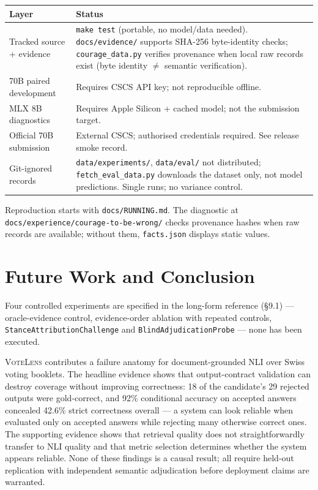 \documentclass[10pt,a4paper]{article}
\newcommand{\votelens}{\textsc{VoteLens}}
\begin{document}
\begin{center}\small
\begin{tabular}{@{}p{3.6cm}p{13.1cm}@{}}
\toprule
Layer & Status \\
\midrule
Tracked source + evidence & \texttt{make test} (portable, no model/data needed). \texttt{docs/evidence/} supports SHA-256 byte-identity checks; \texttt{courage\_data.py} verifies provenance when local raw records exist (byte identity $\neq$ semantic verification). \\
70B paired development & Requires CSCS API key; not reproducible offline. \\
MLX 8B diagnostics & Requires Apple Silicon + cached model; not the submission target. \\
Official 70B submission & External CSCS; authorised credentials required. See release smoke record. \\
Git-ignored records & \texttt{data/experiments/}, \texttt{data/eval/} not distributed; \texttt{fetch\_eval\_data.py} downloads the dataset only, not model predictions. Single runs; no variance control. \\
\bottomrule
\end{tabular}
\end{center}

Reproduction starts with \texttt{docs/RUNNING.md}. The diagnostic at \texttt{docs/experience/}\allowbreak\texttt{courage-to-be-wrong/} checks provenance hashes when raw records are available; without them, \texttt{facts.json} displays static values.

\section{Future Work and Conclusion}

Four controlled experiments are specified in the long-form reference (\S9.1) --- oracle-evidence control, evidence-order ablation with repeated controls, \texttt{StanceAttributionChallenge} and \texttt{BlindAdjudicationProbe} --- none has been executed.

\votelens{} contributes a failure anatomy for document-grounded NLI over Swiss voting booklets. The headline evidence shows that output-contract validation can destroy coverage without improving correctness: 18 of the candidate's 29 rejected outputs were gold-correct, and 92\% conditional accuracy on accepted answers concealed 42.6\% strict correctness overall --- a system can look reliable when evaluated only on accepted answers while rejecting many otherwise correct ones. The supporting evidence shows that retrieval quality does not straightforwardly transfer to NLI quality and that metric selection determines whether the system appears reliable. None of these findings is a causal result; all require held-out replication with independent semantic adjudication before deployment claims are warranted.
\end{document}
